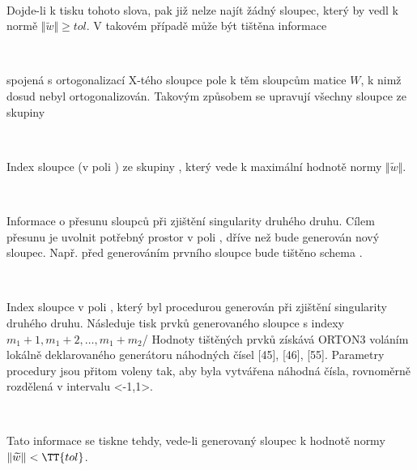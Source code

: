 {{\begin{Minipage}
\\
\end{Minipage}
%
Dojde-li k tisku tohoto slova, pak již nelze najít žádný sloupec,
který by vedl k normě $\Vert\widetilde w\Vert \ge tol$. V takovém
případě může být tištěna informace

\begin{Minipage}
\\
\end{Minipage}
%
spojená s ortogonalizací X-tého sloupce pole  k těm sloupcům
matice $W$, k nimž dosud nebyl ortogonalizován. Takovým způsobem se
upravují všechny  sloupce ze skupiny 


\begin{Minipage}
\\
\end{Minipage}
%
Index  sloupce (v poli ) ze skupiny , který
vede k maximální hodnotě  normy $\Vert\widetilde
w\Vert$.


\begin{Minipage}
\\
\end{Minipage}
%
Informace o přesunu sloupců při zjištění singularity druhého
druhu. Cílem přesunu je uvolnit potřebný prostor v poli ,
dříve než bude generován nový sloupec. Např. před generováním
prvního sloupce bude tištěno schema
.


\begin{Minipage}
\\
\end{Minipage}
%
Index  sloupce v poli , který byl procedurou generován při
zjištění singularity druhého druhu. Následuje tisk prvků
generovaného sloupce s indexy
%
$m_1+1,m_1+2,\ldots,m_1+m_2$/
%
Hodnoty tištěných
prvků získává ORTON3 voláním lokálně deklarovaného generátoru
náhodných čísel  [45], [46], [55]. Parametry procedury
 jsou přitom voleny tak, aby byla vytvářena náhodná čísla,
rovnoměrně rozdělená v intervalu <-1,1>.


\begin{Minipage}
\\
\end{Minipage}
%
Tato informace se tiskne tehdy, vede-li generovaný sloupec k
hodnotě normy $\Vert\widetilde w\Vert< \TT{tol}$.

}}
